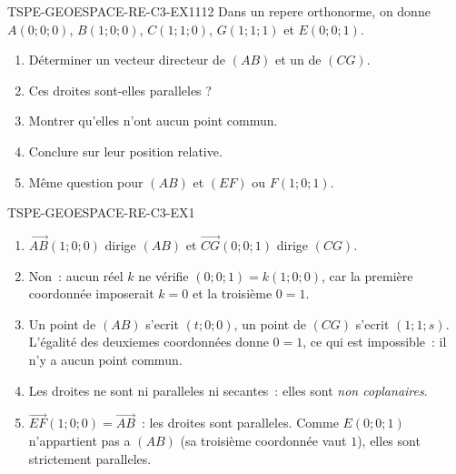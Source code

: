 
\begin{exercice}{TSPE-GEOESPACE-RE-C3-EX1}{1}{12}
Dans un repere orthonorme, on donne
$A(0;0;0)$, $B(1;0;0)$, $C(1;1;0)$, $G(1;1;1)$ et $E(0;0;1)$.
\begin{enumerate}
  \item Déterminer un vecteur directeur de $(AB)$ et un de $(CG)$.
  \item Ces droites sont-elles paralleles ?
  \item Montrer qu'elles n'ont aucun point commun.
  \item Conclure sur leur position relative.
  \item Même question pour $(AB)$ et $(EF)$ ou $F(1;0;1)$.
\end{enumerate}
\end{exercice}


\begin{corrige}{TSPE-GEOESPACE-RE-C3-EX1}
\begin{enumerate}
  \item $\vec{AB}(1;0;0)$ dirige $(AB)$ et $\vec{CG}(0;0;1)$ dirige $(CG)$.
  \item Non~: aucun réel $k$ ne vérifie $(0;0;1)=k(1;0;0)$, car la première
        coordonnée imposerait $k=0$ et la troisième $0=1$.
  \item Un point de $(AB)$ s'ecrit $(t;0;0)$, un point de $(CG)$ s'ecrit
        $(1;1;s)$. L'égalité des deuxiemes coordonnées donne $0=1$, ce qui est
        impossible~: il n'y a aucun point commun.
  \item Les droites ne sont ni paralleles ni secantes~: elles sont
        \emph{non coplanaires}.
  \item $\vec{EF}(1;0;0)=\vec{AB}$~: les droites sont paralleles. Comme
        $E(0;0;1)$ n'appartient pas a $(AB)$ (sa troisième coordonnée vaut
        $1$), elles sont strictement paralleles.
\end{enumerate}
\end{corrige}
